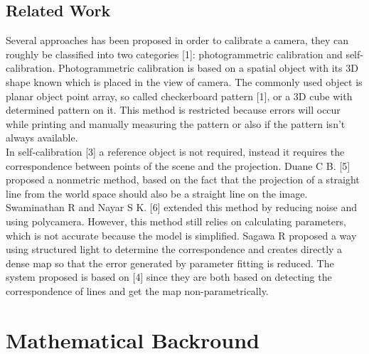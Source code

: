 \documentclass[journal,final,a4paper,twoside]{PS}
\begin{document}
\subsection{Related Work}
\label{sec:related}
Several approaches has been proposed in order to calibrate a camera, they can roughly be classified into two categories [1]: photogrammetric calibration and self-calibration.
Photogrammetric calibration is based on a spatial object with its 3D shape known which is placed in the view of camera. The commonly used object is planar object point array, so called checkerboard pattern [1], or a 3D cube with determined pattern on it. This method is restricted because errors will occur while printing and manually measuring the pattern or also if the pattern isn't always available.\\
In self-calibration [3] a reference object is not required, instead it requires the correspondence between points of the scene and the projection. Duane C B. [5] proposed a nonmetric method, based on the fact that the projection of a straight line from the world space should also be a straight line on the image. Swaminathan R and Nayar S K. [6] extended this method by reducing noise and using polycamera. However, this method still relies on calculating parameters, which is not accurate because the model is simplified. 
Sagawa R  proposed a way using structured light to determine the correspondence and creates directly a dense map so that the error generated by parameter fitting is reduced. 
The system proposed is based on [4] since they are both based on detecting the correspondence of lines and get the map non-parametrically. \cite{Faugeras:1992}

\section{Mathematical Backround}
\label{sec:maths}
\end{document}
